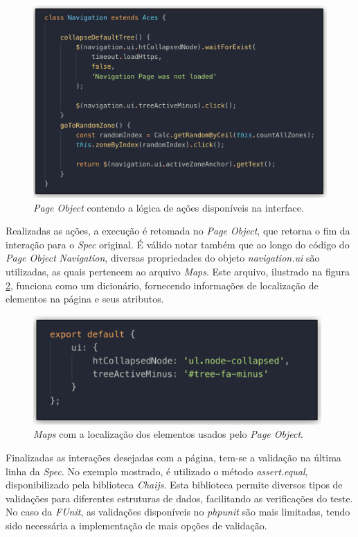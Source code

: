 \begin{figure}[H]
    \centering
    \includegraphics[width=14.5cm]{source/4-solucao/images/fate-page-object.png}
    \caption{\emph{Page Object} contendo a lógica de ações disponíveis na interface.}
    \label{fig:fate-page-object}
\end{figure}

Realizadas as ações, a execução é retomada no \emph{Page Object}, que retorna o fim da interação para o \emph{Spec} original. É válido notar também que ao longo do código do \emph{Page Object} \emph{Navigation}, diversas propriedades do objeto \emph{navigation.ui} são utilizadas, as quais pertencem ao arquivo \emph{Maps}. Este arquivo, ilustrado na figura \ref{fig:fate-maps}, funciona como um dicionário, fornecendo informações de localização de elementos na página e seus atributos.

\begin{figure}[H]
    \centering
    \includegraphics[width=11cm]{source/4-solucao/images/fate-maps.png}
    \caption{\emph{Maps} com a localização dos elementos usados pelo \emph{Page Object}.}
    \label{fig:fate-maps}
\end{figure}

Finalizadas as interações desejadas com a página, tem-se a validação na última linha da \emph{Spec}. No exemplo mostrado, é utilizado o método \emph{assert.equal}, disponibilizado pela biblioteca \emph{Chaijs}. Esta biblioteca permite diversos tipos de validações para diferentes estruturas de dados, facilitando as verificações do teste. No caso da \emph{FUnit}, as validações disponíveis no \emph{phpunit} são mais limitadas, tendo sido necessária a implementação de mais opções de validação.

